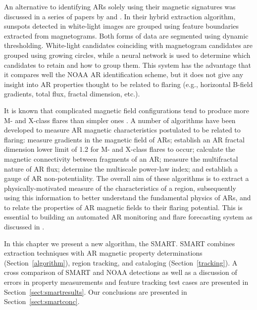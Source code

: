 An alternative to identifying \glspl{AR} solely using their magnetic signatures was discussed in a series of papers by \citet{Qahwaji:2005} and \citet{Colak:2008,Colak:2009}. In their hybrid extraction algorithm, sunspots detected in white-light images are grouped using feature boundaries extracted from magnetograms. Both forms of data are segmented using dynamic thresholding. White-light candidates coinciding with magnetogram candidates are grouped using growing circles, while a neural network is used to determine which candidates to retain and how to group them. This system has the advantage that it compares well the \gls{NOAA} \gls{AR} identification scheme, but it does not give any insight into \gls{AR} properties thought to be related to flaring (e.g., horizontal B-field gradients, total flux, fractal dimension, etc.).

It is known that complicated magnetic field configurations tend to produce more M- and X-class flares than simpler ones \citep{Kunzel:1960,McIntosh:1990}. A number of algorithms have been developed to measure \gls{AR} magnetic characteristics postulated to be related to flaring: \citet{Gallagher:2002} measure gradients in the magnetic field of \glspl{AR}; \citet{mcateer:2005b} establish an \gls{AR} fractal dimension lower limit of 1.2 for M- and X-class flares to occur; \citet{Georgoulis:2007} calculate the magnetic connectivity between fragments of an \gls{AR};  \citet{Conlon:2008,Conlon:2010a} measure the multifractal nature of \gls{AR} flux; \citet{Hewett:2008} determine the multiscale power-law index; and \citet{Falconer:2008} establish a gauge of \gls{AR} non-potentiality.
The overall aim of these algorithms is to extract a physically-motivated measure of the characteristics of a region, subsequently using this information to better understand the fundamental physics of \glspl{AR}, and to relate the properties of \gls{AR} magnetic fields to their flaring potential. This is essential to building an automated \gls{AR} monitoring and flare forecasting system as discussed in \citet{McAteer:2009}. 

In this chapter we present a new algorithm, the \gls{SMART}.
\gls{SMART} combines extraction techniques with \gls{AR} magnetic property determinations (Section~\ref{algorithm}), region tracking, and cataloging (Section~\ref{tracking}). 
A cross comparison of \gls{SMART} and \gls{NOAA} detections as well as a discussion of errors in property measurements and feature tracking test cases are presented in Section~\ref{sect:smartresults}. Our conclusions are presented in Section~\ref{sect:smartconc}.

